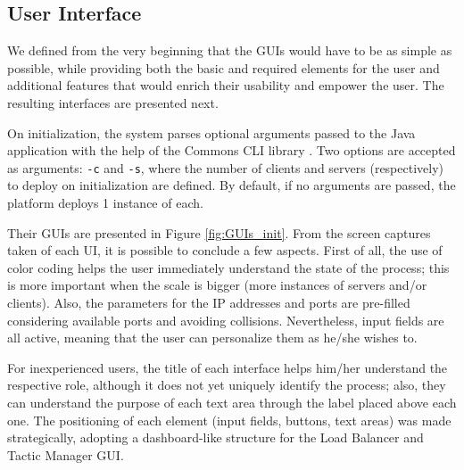 \documentclass[12pt]{article}
\begin{document}
\newpage
\subsection{User Interface} \label{ui} %

We defined from the very beginning that the GUIs would have to be as simple as possible, while providing both the basic and required elements for the user and 
additional features that would enrich their usability and empower the user.
The resulting interfaces are presented next.

On initialization, the system parses optional arguments passed to the Java application with the help of the Commons CLI library \cite{commonscli}.
Two options are accepted as arguments: \texttt{-c} and \texttt{-s}, where the number of clients and servers (respectively) to deploy on initialization are defined.
By default, if no arguments are passed, the platform deploys 1 instance of each.

Their GUIs are presented in Figure \ref{fig:GUIs_init}.
From the screen captures taken of each UI, it is possible to conclude a few aspects.
First of all, the use of color coding helps the user immediately understand the state of the process; this is more important when the scale is bigger (more 
instances of servers and/or clients).
Also, the parameters for the IP addresses and ports are pre-filled considering available ports and avoiding collisions.
Nevertheless, input fields are all active, meaning that the user can personalize them as he/she wishes to.

For inexperienced users, the title of each interface helps him/her understand the respective role, although it does not yet uniquely identify the process;
also, they can understand the purpose of each text area through the label placed above each one.
The positioning of each element (input fields, buttons, text areas) was made strategically, adopting a dashboard-like structure for the Load Balancer and 
Tactic Manager GUI.
\end{document}
